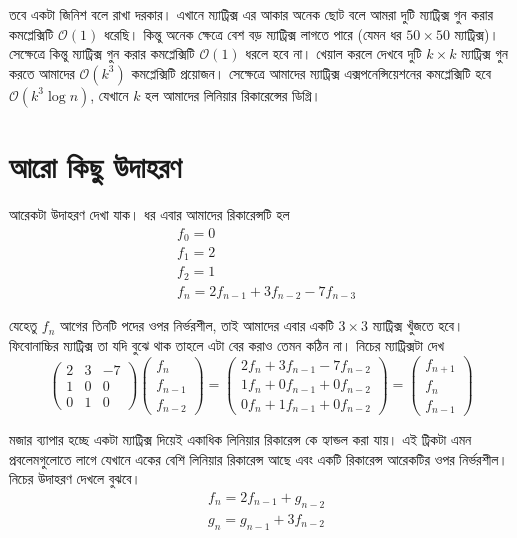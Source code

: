 \noindent তবে একটা জিনিশ বলে রাখা দরকার। এখানে ম্যাট্রিক্স এর আকার অনেক ছোট বলে আমরা দুটি ম্যাট্রিক্স গুন করার কমপ্লেক্সিটি $\mathcal{O}(1)$ ধরেছি। কিন্তু অনেক ক্ষেত্রে বেশ বড় ম্যাট্রিক্স লাগতে পারে (যেমন ধর $50 \times 50$ ম্যাট্রিক্স)। সেক্ষেত্রে কিন্তু ম্যাট্রিক্স গুন করার কমপ্লেক্সিটি $\mathcal{O}(1)$ ধরলে হবে না। খেয়াল করলে দেখবে দুটি $k \times k$ ম্যাট্রিক্স গুন করতে আমাদের $\mathcal{O}(k^3)$ কমপ্লেক্সিটি প্রয়োজন। সেক্ষেত্রে আমাদের ম্যাট্রিক্স এক্সপনেন্সিয়েশনের কমপ্লেক্সিটি হবে $\mathcal{O}(k^{3} \log{n})$, যেখানে $k$ হল আমাদের লিনিয়ার রিকারেন্সের ডিগ্রি।

\section{আরো কিছু উদাহরণ}

\noindent আরেকটা উদাহরণ দেখা যাক। ধর এবার আমাদের রিকারেন্সটি হল
\begin{align*}
& f_{0} = 0 \\
& f_{1} = 2 \\
& f_{2} = 1 \\
& f_{n} = 2f_{n - 1} + 3f_{n - 2} - 7f_{n - 3}
\end{align*}

\noindent যেহেতু $f_{n}$ আগের তিনটি পদের ওপর নির্ভরশীল, তাই আমাদের এবার একটি $3 \times 3$ ম্যাট্রিক্স খুঁজতে হবে। ফিবোনাচ্চির ম্যাট্রিক্স তা যদি বুঝে থাক তাহলে এটা বের করাও তেমন কঠিন না। নিচের ম্যাট্রিক্সটা দেখ
$$
\begin{pmatrix}
2 & 3 & -7 \\
1 & 0 & 0 \\
0 & 1 & 0
\end{pmatrix}
\begin{pmatrix}
f_{n} \\
f_{n - 1} \\
f_{n - 2}
\end{pmatrix}
=
\begin{pmatrix}
2f_{n} + 3f_{n - 1} - 7f_{n - 2}\\
1f_{n} + 0f_{n - 1} + 0f_{n - 2} \\
0f_{n} + 1f_{n - 1} + 0f_{n - 2}
\end{pmatrix}
=
\begin{pmatrix}
f_{n + 1} \\
f_{n} \\
f_{n - 1}
\end{pmatrix}
$$

\noindent মজার ব্যাপার হচ্ছে একটা ম্যাট্রিক্স দিয়েই একাধিক লিনিয়ার রিকারেন্স কে হ্যান্ডল করা যায়। এই ট্রিকটা এমন প্রবলেমগুলোতে লাগে যেখানে একের বেশি লিনিয়ার রিকারেন্স আছে এবং একটি রিকারেন্স আরেকটির ওপর নির্ভরশীল। নিচের উদাহরণ দেখলে বুঝবে।
\begin{align*}
& f_{n} = 2f_{n - 1} + g_{n - 2} \\
& g_{n} = g_{n - 1} + 3f_{n - 2}
\end{align*}

